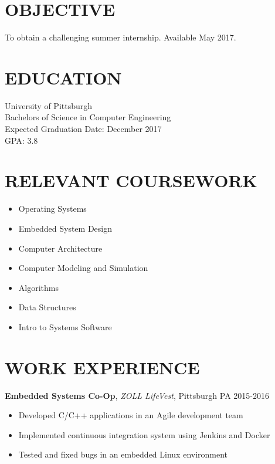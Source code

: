 \documentclass[line,margin]{res}
\begin{document}
\address{3136 Colony Lane \\ Plymouth Meeting, PA 19462 \\ (484) 866-6792 \\ djm158@pitt.edu}

\begin{resume}
    \section{OBJECTIVE}
    To obtain a challenging summer internship. Available May 2017.

    \section{EDUCATION}
    University of Pittsburgh \\
    Bachelors of Science in Computer Engineering \\
    Expected Graduation Date: December 2017 \\
    GPA: 3.8

    \section{RELEVANT COURSEWORK}
    \begin{itemize}
        \item Operating Systems
        \item Embedded System Design
        \item Computer Architecture
        \item Computer Modeling and Simulation
        \item Algorithms
        \item Data Structures
        \item Intro to Systems Software
    \end{itemize}

    \section{WORK EXPERIENCE}
    \textbf{Embedded Systems Co-Op}, \textit{ZOLL LifeVest}, Pittsburgh PA  \hfill 2015-2016 \\
    \begin{itemize}
        \item Developed C/C++ applications in an Agile development team
        \item Implemented continuous integration system using Jenkins and Docker
        \item Tested and fixed bugs in an embedded Linux environment
    \end{itemize}


\end{resume}
\end{document}
